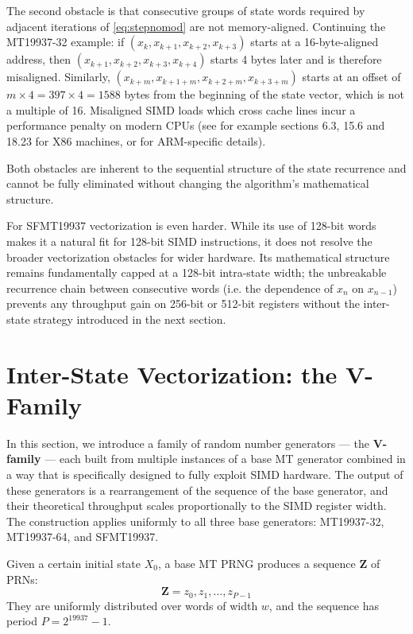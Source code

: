 \documentclass[preprint,1p,times]{elsarticle}
\begin{document}
The second obstacle is that consecutive groups of state words required by adjacent iterations of \eqref{eq:stepnomod} are not memory-aligned. Continuing the MT19937-32 example: if $(x_k, x_{k+1}, x_{k+2}, x_{k+3})$ starts at a 16-byte-aligned address, then $(x_{k+1}, x_{k+2}, x_{k+3}, x_{k+4})$ starts 4 bytes later and is therefore misaligned. Similarly, $(x_{k+m}, x_{k+1+m}, x_{k+2+m}, x_{k+3+m})$ starts at an offset of $m \times 4 = 397 \times 4 = 1588$ bytes from the beginning of the state vector, which is not a multiple of 16. Misaligned SIMD loads which cross cache lines incur a performance penalty on modern CPUs (see for example \cite{intel} sections 6.3, 15.6 and 18.23 for X86 machines, or \cite{arm} for ARM-specific details).

Both obstacles are inherent to the sequential structure of the state recurrence and cannot be fully eliminated without changing the algorithm's mathematical structure.

For SFMT19937 vectorization is even harder. While its use of 128-bit words makes it a natural fit for 128-bit SIMD instructions, it does not resolve the broader vectorization obstacles for wider hardware. Its mathematical structure remains fundamentally capped at a 128-bit intra-state width; the unbreakable recurrence chain between consecutive words (i.e. the dependence of $x_n$ on $x_{n-1}$) prevents any throughput gain on 256-bit or 512-bit registers without the inter-state strategy introduced in the next section.

\section{Inter-State Vectorization: the V-Family}
\label{sec:simdgen}
In this section, we introduce a family of random number generators --- the \textbf{V-family} --- each built from multiple instances of a base MT generator combined in a way that is specifically designed to fully exploit SIMD hardware. The output of these generators is a rearrangement of the sequence of the base generator, and their theoretical throughput scales proportionally to the SIMD register width. The construction applies uniformly to all three base generators: MT19937-32, MT19937-64, and SFMT19937.

Given a certain initial state $X_0$, a base MT PRNG produces a sequence $\boldsymbol{Z}$ of PRNs:
\begin{equation}
\label{eq:mainseq}
   \boldsymbol{Z} = z_0, z_1, \dots, z_{P-1}
\end{equation}
They are uniformly distributed over words of width $w$, and the sequence has period $P=2^{19937}-1$.
\end{document}
